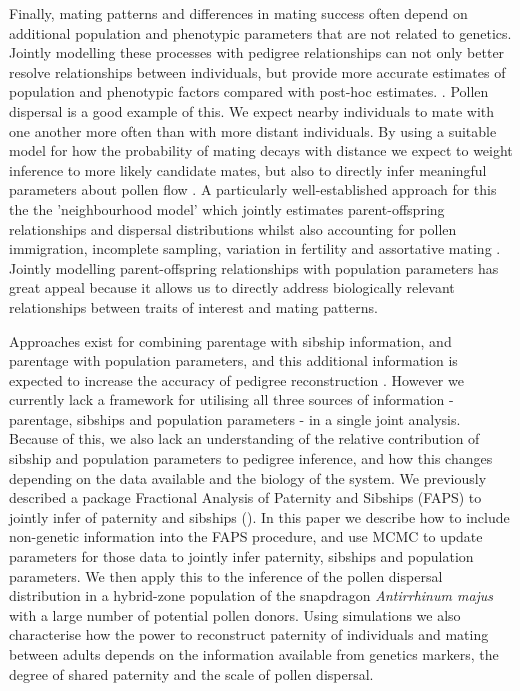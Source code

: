 \documentclass[10pt, a4paper, twocolumn]{article} %
\begin{document}
Finally, mating patterns and differences in mating success often depend on additional population and phenotypic parameters that are not related to genetics.
Jointly modelling these processes with pedigree relationships can not only better resolve relationships between individuals, but provide more accurate estimates of population and phenotypic factors compared with post-hoc estimates. \citep{neff2001bayesian, hadfield2006towards}.
Pollen dispersal is a good example of this.
We expect nearby individuals to mate with one another more often than with more distant individuals.
By using a suitable model for how the probability of mating decays with distance we expect to weight inference to more likely candidate mates, but also to directly infer meaningful parameters about pollen flow \citep{adams1992using, jones2003maximum, oddou2005pollen, klein2008pollen, chybicki2013seeing}.
A particularly well-established approach for this the the 'neighbourhood model' which jointly estimates parent-offspring relationships and dispersal distributions whilst also accounting for pollen immigration, incomplete sampling, variation in fertility and assortative mating \citep{adams1989mating, burczyk2004cautions, oddou2005pollen, chybicki2013seeing, gerard2006assortative, chybicki2018nmpi, chybicki2021identification}.
Jointly modelling parent-offspring relationships with population parameters has great appeal because it allows us to directly address biologically relevant relationships between traits of interest and mating patterns.

Approaches exist for combining parentage with sibship information, and parentage with population parameters, and this additional information is expected to increase the accuracy of pedigree reconstruction \citep{neff2001bayesian, wang2007parentage, walling2010comparing}.
However we currently lack a framework for utilising all three sources of information - parentage, sibships and population parameters - in a single joint analysis.
Because of this, we also lack an understanding of the relative contribution of sibship and population parameters to pedigree inference, and how this changes depending on the data available and the biology of the system.
We previously described a package Fractional Analysis of Paternity and Sibships (FAPS) to jointly infer of paternity and sibships (\cite{ellis2018efficient}).
In this paper we describe how to include non-genetic information into the FAPS procedure, and use MCMC to update parameters for those data to jointly infer paternity, sibships and population parameters.
We then apply this to the inference of the pollen dispersal distribution in a hybrid-zone population of the snapdragon \textit{Antirrhinum majus} with a large number of potential pollen donors.
Using simulations we also characterise how the power to reconstruct paternity of individuals and mating between adults depends on the information available from genetics markers, the degree of shared paternity and the scale of pollen dispersal.
\end{document}
